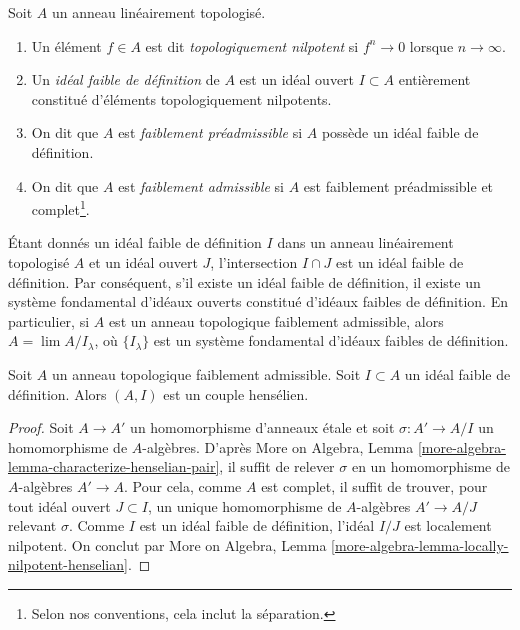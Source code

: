 \begin{definition}
\label{definition-weakly-admissible}
Soit $A$ un anneau linéairement topologisé.
\begin{enumerate}
\item Un élément $f \in A$ est dit {\it topologiquement nilpotent}
si $f^n \to 0$ lorsque $n \to \infty$.
\item Un {\it idéal faible de définition} de $A$ est un idéal ouvert
$I \subset A$ entièrement constitué d'éléments topologiquement nilpotents.
\item On dit que $A$ est {\it faiblement préadmissible} si $A$ possède un idéal faible
de définition.
\item On dit que $A$ est {\it faiblement admissible} si $A$ est faiblement préadmissible
et complet\footnote{Selon nos conventions, cela inclut la séparation.}.
\end{enumerate}
\end{definition}

\noindent
Étant donnés un idéal faible de définition $I$ dans un anneau linéairement topologisé
$A$ et un idéal ouvert $J$, l'intersection $I \cap J$ est un
idéal faible de définition. Par conséquent, s'il existe un idéal faible de définition,
il existe un système fondamental d'idéaux ouverts
constitué d'idéaux faibles de définition. En particulier,
si $A$ est un anneau topologique faiblement admissible, alors
$A = \lim A/I_\lambda$, où $\{I_\lambda\}$ est un système fondamental
d'idéaux faibles de définition.

\begin{lemma}
\label{lemma-weakly-admissible-henselian}
Soit $A$ un anneau topologique faiblement admissible. Soit $I \subset A$
un idéal faible de définition. Alors $(A, I)$ est un couple hensélien.
\end{lemma}

\begin{proof}
Soit $A \to A'$ un homomorphisme d'anneaux étale et soit $\sigma : A' \to A/I$
un homomorphisme de $A$-algèbres. D'après More on Algebra, Lemma
\ref{more-algebra-lemma-characterize-henselian-pair}, il suffit
de relever $\sigma$ en un homomorphisme de $A$-algèbres $A' \to A$.
Pour cela, comme $A$ est complet, il suffit de trouver,
pour tout idéal ouvert $J \subset I$, un unique homomorphisme de $A$-algèbres $A' \to A/J$
relevant $\sigma$. Comme $I$ est un idéal faible de définition,
l'idéal $I/J$ est localement nilpotent. On conclut par
More on Algebra, Lemma \ref{more-algebra-lemma-locally-nilpotent-henselian}.
\end{proof}

